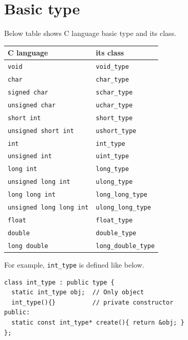 \section{Basic type}

Below table shows C language basic type and its class.

\begin{latexonly}
\vspace{0.5cm}
\end{latexonly}

\begin{tabular}{|l|l|} \hline
C language & its class \\ \hline
{\tt{void}} & {\tt{void\_type}} \\ \hline
{\tt{char}} & {\tt{char\_type}} \\  \hline
{\tt{signed char}} & {\tt{schar\_type}} \\  \hline
{\tt{unsigned char}} & {\tt{uchar\_type}} \\  \hline
{\tt{short int}} & {\tt{short\_type}} \\  \hline
{\tt{unsigned short int}} & {\tt{ushort\_type}} \\  \hline
{\tt{int}} & {\tt{int\_type}} \\ \hline
{\tt{unsigned int}} & {\tt{uint\_type}} \\  \hline
{\tt{long int}} & {\tt{long\_type}} \\ \hline
{\tt{unsigned long int}} & {\tt{ulong\_type}} \\ \hline
{\tt{long long int}} & {\tt{long\_long\_type}} \\ \hline
{\tt{unsigned long long int}} & {\tt{ulong\_long\_type}} \\ \hline
{\tt{float}} & {\tt{float\_type}} \\ \hline
{\tt{double}} & {\tt{double\_type}} \\ \hline
{\tt{long double}} & {\tt{long\_double\_type}} \\ \hline
\end{tabular}

\begin{latexonly}
\vspace{0.5cm}
\end{latexonly}

For example, {\tt{int\_type}} is defined like below.
\begin{verbatim}
class int_type : public type {
  static int_type obj;  // Only object
  int_type(){}          // private constructor
public:
  static const int_type* create(){ return &obj; }
};
\end{verbatim}

